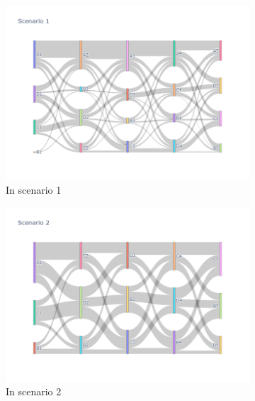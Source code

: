 \begin{figure}[h]
  \begin{subfigure}{0.5\textwidth}
    \centering
    \includegraphics[width=\textwidth]{Figure/Figure27a.jpg}
    \caption{In scenario 1}
    \label{fig27a}
  \end{subfigure}
  \begin{subfigure}{0.5\textwidth}
    \centering
    \includegraphics[width=\linewidth]{Figure/Figure27b.jpg}
    \caption{In scenario 2}
    \label{fig27b}
  \end{subfigure}
  \begin{subfigure}{0.5\textwidth}
    \centering

\end{subfigure}
\end{figure}
